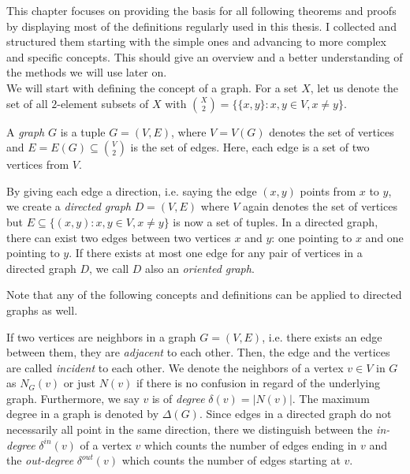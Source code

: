 This chapter focuses on providing the basis for all following theorems and proofs by displaying most of the definitions regularly used in this thesis. I collected and structured them starting with the simple ones and advancing to more complex and specific concepts. This should give an overview and a better understanding of the methods we will use later on.\\

We will start with defining the concept of a graph. For a set $X$, let us denote the set of all $2$-element subsets of $X$ with ${X\choose 2} =\lbrace \lbrace x,y\rbrace : x,y\in V, x\neq y\rbrace$.
\begin{defn}[Graph]
A \textit{graph} $G$ is a tuple $G=(V,E)$, where $V=V(G)$ denotes the set of vertices and $E=E(G)\subseteq {V\choose 2}$ is the set of edges. Here, each edge is a set of two vertices from $V$.
\end{defn}

By giving each edge a direction, i.e. saying the edge $(x,y)$ points from $x$ to $y$, we create a \textit{directed graph} $D=(V,E)$ where $V$ again denotes the set of vertices but $E\subseteq \lbrace (x,y) : x,y\in V, x\neq y\rbrace$ is now a set of tuples. In a directed graph, there can exist two edges between two vertices $x$ and $y$: one pointing to $x$ and one pointing to $y$. If there exists at most one edge for any pair of vertices in a directed graph $D$, we call $D$ also an \textit{oriented graph}.

\begin{note}
Note that any of the following concepts and definitions can be applied to directed graphs as well.
\end{note}

If two vertices are neighbors in a graph $G=(V,E)$, i.e. there exists an edge between them, they are \textit{adjacent} to each other. Then, the edge and the vertices are called \textit{incident} to each other. We denote the neighbors of a vertex $v\in V$ in $G$ as $N_G(v)$ or just $N(v)$ if there is no confusion in regard of the underlying graph. Furthermore, we say $v$ is of \textit{degree} $\delta (v) =\vert N(v)\vert$. The maximum degree in a graph is denoted by $\Delta (G)$. Since edges in a directed graph do not necessarily all point in the same direction, there we distinguish between the \textit{in-degree} $\delta^{in}(v)$ of a vertex $v$ which counts the number of edges ending in $v$ and the \textit{out-degree} $\delta^{out}(v)$ which counts the number of edges starting at $v$.\\


